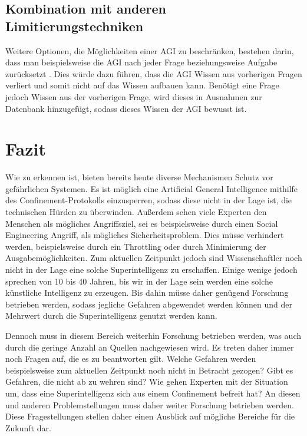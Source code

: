         \subsection{Kombination mit anderen Limitierungstechniken}
        Weitere Optionen, die Möglichkeiten einer AGI zu beschränken, bestehen darin, dass man beispielsweise die
        AGI nach jeder Frage beziehungsweise Aufgabe zurücksetzt \cite[s. 309]{armstrongforthcoming}. Dies würde dazu
        führen, dass die AGI Wissen aus vorherigen Fragen verliert und somit nicht auf das Wissen aufbauen kann.
        Benötigt eine Frage jedoch Wissen aus der vorherigen Frage, wird dieses in Ausnahmen zur Datenbank hinzugefügt,
        sodass dieses Wissen der AGI bewusst ist.

    \section{Fazit}
        Wie zu erkennen ist, bieten bereits heute diverse Mechanismen Schutz vor gefährlichen Systemen. Es ist möglich
        eine Artificial General Intelligence mithilfe des Confinement-Protokolls einzusperren, sodass diese nicht in der
        Lage ist, die technischen Hürden zu überwinden. Außerdem sehen viele Experten den Menschen als mögliches Angriffsziel,
        sei es beispielsweise durch einen Social Engineering Angriff, als mögliches Sicherheitsproblem. Dies müsse
        verhindert werden, beispielsweise durch ein Throttling oder durch Minimierung der Ausgabemöglichkeiten. Zum
        aktuellen Zeitpunkt jedoch sind Wissenschaftler noch nicht in der Lage eine solche Superintelligenz zu erschaffen.
        Einige wenige jedoch sprechen von 10 bis 40 Jahren, bis wir in der Lage sein werden eine solche künstliche
        Intelligenz zu erzeugen. Bis dahin müsse daher genügend Forschung betrieben werden, sodass jegliche Gefahren
        abgewendet werden können und der Mehrwert durch die Superintelligenz genutzt werden kann.

        Dennoch muss in diesem Bereich weiterhin Forschung betrieben werden, was auch durch die geringe Anzahl an Quellen
        nachgewiesen wird. Es treten daher immer noch Fragen auf, die es zu beantworten gilt. Welche Gefahren werden
        beispielsweise zum aktuellen Zeitpunkt noch nicht in Betracht gezogen? Gibt es Gefahren, die nicht ab zu wehren
        sind? Wie gehen Experten mit der Situation um, dass eine Superintelligenz sich aus einem Confinement befreit hat?
        An diesen und anderen Problemstellungen muss daher weiter Forschung betrieben werden. Diese Fragestellungen stellen
        daher einen Ausblick auf mögliche Bereiche für die Zukunft dar.

    \newpage
    
    

